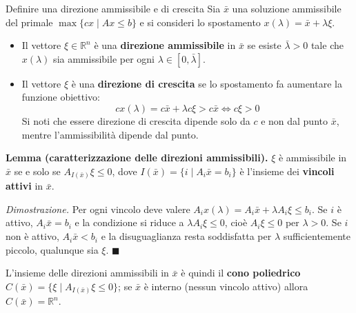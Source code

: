 \documentclass[12pt]{extarticle} %
\begin{document}
\begin{teoriabox}{Definire una direzione ammissibile e di crescita}
Sia $\bar{x}$ una soluzione ammissibile del primale $\max\{cx \mid Ax \le b\}$ e si consideri lo spostamento $x(\lambda) = \bar{x} + \lambda\xi$.
\begin{itemize}
    \item Il vettore $\xi \in \mathbb{R}^n$ è una \textbf{direzione ammissibile} in $\bar{x}$ se esiste $\bar{\lambda} > 0$ tale che $x(\lambda)$ sia ammissibile per ogni $\lambda \in [0,\bar{\lambda}]$.
    \item Il vettore $\xi$ è una \textbf{direzione di crescita} se lo spostamento fa aumentare la funzione obiettivo:
    \[
    cx(\lambda) = c\bar{x} + \lambda c\xi > c\bar{x} \iff c\xi > 0
    \]
    Si noti che essere direzione di crescita dipende solo da $c$ e non dal punto $\bar{x}$, mentre l'ammissibilità dipende dal punto.
\end{itemize}

\noindent\textbf{Lemma (caratterizzazione delle direzioni ammissibili).} $\xi$ è ammissibile in $\bar{x}$ se e solo se $A_{I(\bar{x})}\xi \le 0$, dove $I(\bar{x}) = \{i \mid A_i\bar{x} = b_i\}$ è l'insieme dei \textbf{vincoli attivi} in $\bar{x}$.

\noindent\textit{Dimostrazione.} Per ogni vincolo deve valere $A_ix(\lambda) = A_i\bar{x} + \lambda A_i\xi \le b_i$. Se $i$ è attivo, $A_i\bar{x} = b_i$ e la condizione si riduce a $\lambda A_i\xi \le 0$, cioè $A_i\xi \le 0$ per $\lambda>0$. Se $i$ non è attivo, $A_i\bar{x} < b_i$ e la disuguaglianza resta soddisfatta per $\lambda$ sufficientemente piccolo, qualunque sia $\xi$. $\blacksquare$

\noindent L'insieme delle direzioni ammissibili in $\bar{x}$ è quindi il \textbf{cono poliedrico} $C(\bar{x}) = \{\xi \mid A_{I(\bar{x})}\xi \le 0\}$; se $\bar{x}$ è interno (nessun vincolo attivo) allora $C(\bar{x}) = \mathbb{R}^n$.
\end{teoriabox}
\end{document}

